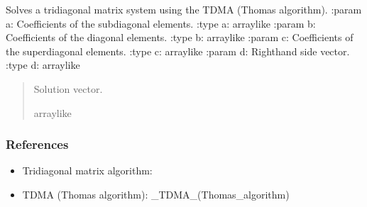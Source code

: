 \documentclass[a4paper,11pt,english,openany]{sphinxmanual}
\begin{document}
\begin{fulllineitems}
\begin{fulllineitems}
\begin{quote}
\begin{description}
\end{description}\end{quote}

\end{fulllineitems}


\begin{fulllineitems}
\label{\detokenize{api/spyice.models.advection_diffusion:src.spyice.models.advection_diffusion.AdvectionDiffusion.TDMAsolver}}
\pysigstartsignatures
\pysiglinewithargsret
{}
{\sphinxparamcomma {}\sphinxparamcomma {}\sphinxparamcomma {}}
{}
\pysigstopsignatures
\sphinxAtStartPar
Solves a tridiagonal matrix system using the TDMA (Thomas algorithm).
:param a: Coefficients of the sub\sphinxhyphen{}diagonal elements.
:type a: array\sphinxhyphen{}like
:param b: Coefficients of the diagonal elements.
:type b: array\sphinxhyphen{}like
:param c: Coefficients of the super\sphinxhyphen{}diagonal elements.
:type c: array\sphinxhyphen{}like
:param d: Right\sphinxhyphen{}hand side vector.
:type d: array\sphinxhyphen{}like
\begin{quote}\begin{description}
\sphinxAtStartPar
Solution vector.

\sphinxAtStartPar
array\sphinxhyphen{}like

\end{description}\end{quote}
\subsubsection*{References}
\begin{itemize}
\item {} 
\sphinxAtStartPar
Tridiagonal matrix algorithm: 

\item {} 
\sphinxAtStartPar
TDMA (Thomas algorithm): \sphinxhyphen{}\_TDMA\_(Thomas\_algorithm)

\end{itemize}


\end{fulllineitems}
\end{fulllineitems}
\end{document}
